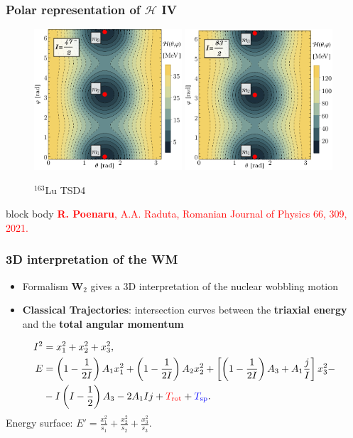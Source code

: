 \documentclass{beamer}
\begin{document}
\begin{frame}
	\frametitle{Polar representation of $\mathcal{H}$ IV}
	\vspace{-1cm}
	\begin{figure}
		\centering
		\caption{$^{163}$Lu TSD4}
		\includegraphics[width=0.49\textwidth]{figures/parity-partners-plots/contour-tsd4-1.pdf}
		\includegraphics[width=0.49\textwidth]{figures/parity-partners-plots/contour-tsd4-2.pdf}
	\end{figure}
	\begin{beamercolorbox}[rounded=true,shadow=false, wd=\linewidth,]{block body}
		\centering
		\textcolor{red}{\footnotesize{\textbf{R. Poenaru}, A.A. Raduta, Romanian Journal of Physics 66, 309, 2021.}}
	\end{beamercolorbox}
\end{frame}

\begin{frame}
	\frametitle{3D interpretation of the WM}
	\begin{itemize}
		\item Formalism $\mathbf{W}_2$ gives a 3D interpretation of the nuclear wobbling motion
		\item \textbf{Classical Trajectories}: intersection curves between the \textbf{triaxial energy} and the \textbf{total angular momentum}
	\end{itemize}
	\begin{align}
		I^2&=x_1^2+x_2^2+x_3^2,\nonumber\\
		E&=\left(1-\frac{1}{2I}\right)A_1x_1^2+\left(1-\frac{1}{2I}\right)A_2x_2^2+\left[\left(1-\frac{1}{2I}\right)A_3+A_1\frac{j}{I}\right]x_3^2-\nonumber\\
		&-I\left(I-\frac{1}{2}\right)A_3-2A_1Ij+{\color{red}T_\text{rot}}+{\color{blue}T_\text{sp}}.\nonumber
	\end{align}
	Energy surface: $E'=\frac{x_1^2}{s_1}+\frac{x_2^2}{s_2}+\frac{x_3^2}{s_3}$.
\end{frame}
\end{document}
